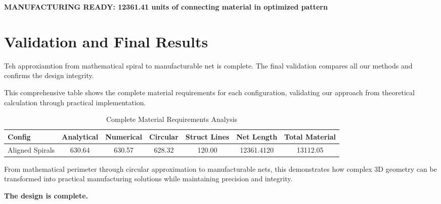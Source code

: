 \documentclass{article}%
\begin{document}
%
\vspace{1cm}%
\begin{center}%
{\large\bfseries\color{storycolor} MANUFACTURING READY: 12361.41 units of connecting material in optimized pattern}%
\end{center}

%
\newpage%
\section{Validation and Final Results}%
\label{sec:ValidationandFinalResults}%
\begin{storybox}%
Teh approxiamtion from mathematical spiral to manufacturable net is complete.
            The final validation compares all our methods and confirms the design integrity.

            This comprehensive table shows the complete material requirements for each configuration,
            validating our approach from theoretical calculation through practical implementation.%
\end{storybox}%
\vspace{1cm}%


\begin{table}[h!]%
\caption{Complete Material Requirements Analysis}%
\begin{center}%
\begin{tabular}{@{}|l|c|c|c|c|c|c|@{}}%
\toprule%
\midrule%
\textbf{Config}&\textbf{Analytical}&\textbf{Numerical}&\textbf{Circular}&\textbf{Struct Lines}&\textbf{Net Length}&\textbf{Total Material}\\%
\midrule%
Aligned Spirals&630.64&630.57&628.32&120.00&12361.4120&13112.05\\%
\midrule\bottomrule%
%
\end{tabular}%
\end{center}%
\end{table}

%
\vspace{1cm}%
\begin{storybox}%
From mathematical perimeter through circular approximation to manufacturable nets,
            this demonstrates how complex 3D geometry can be transformed into
            practical manufacturing solutions while maintaining precision and integrity.

            \textbf{The design is complete.}%
\end{storybox}

%
\end{document}

